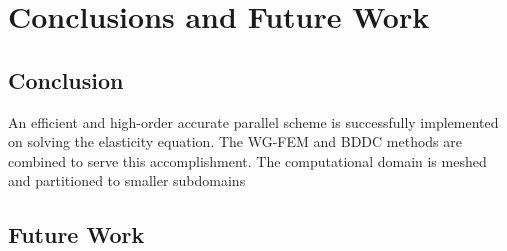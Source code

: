 \chapter{Conclusions and Future Work}

\section{Conclusion}

An efficient and high-order accurate parallel scheme is successfully implemented on solving the elasticity equation. The WG-FEM and BDDC methods are combined to serve this accomplishment. The computational domain is meshed and partitioned to smaller subdomains

\section{Future Work}